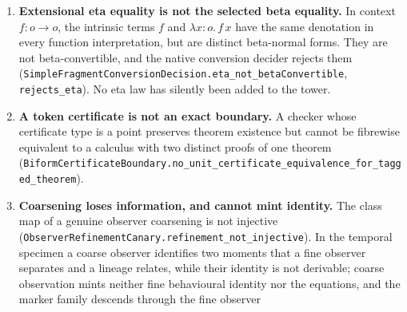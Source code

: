 \documentclass[11pt]{article}
\theoremstyle{definition}
\theoremstyle{remark}
\begin{document}
\begin{enumerate}
  ground type has no closed term, by its interpretation in the empty set.
  It has no beta class either. Thus unrestricted inhabitation reflection is
  false, and there is not even a function from this contextual tower ground
  fibre to the corresponding simple raw or quotient fibre
  (\nolinkurl{no_contextual_ground_class_retraction}). The empty telescope
  and final ground type are both formed, so adding endpoint formation alone
  does not repair the missing internal premises. The existing
  \nolinkurl{BoundaryJudgments.TowerMeaning} predicates for both checking
  and synthesis also hold for this example
  (\nolinkurl{omega_tower_check_meaning},
  \nolinkurl{omega_tower_synthesis_meaning}); this is a semantic assertion,
  not acceptance by an executable checker. This is a boundary of the
  implemented permissive relation, not of Martin-L\"of type theory, the
  regular two-sort kernel, or Lean's kernel. It is compatible with conversion
  conservativity between two already translated simple terms. The separate
  four-rule declaration-aware structural checker does not include the
  lambda, application, or conversion rules used by this counterexample;
  no acceptance claim about that checker follows here.
\item \textbf{Extensional eta equality is not the selected beta equality.}
  In context $f:o\to o$, the intrinsic terms $f$ and $\lambda x:o.\,f\,x$
  have the same denotation in every function interpretation, but are distinct
  beta-normal forms. They are not beta-convertible, and the native conversion
  decider rejects them
  (\nolinkurl{SimpleFragmentConversionDecision.eta_not_betaConvertible},
  \nolinkurl{rejects_eta}). No eta law has silently been added to the tower.
\item \textbf{A token certificate is not an exact boundary.}  A checker whose
  certificate type is a point preserves theorem existence but cannot be
  fibrewise equivalent to a calculus with two distinct proofs of one theorem
  (\nolinkurl{BiformCertificateBoundary.no_unit_certificate_equivalence_for_tagged_theorem}).
\item \textbf{Coarsening loses information, and cannot mint identity.}  The
  class map of a genuine observer coarsening is not injective
  (\nolinkurl{ObserverRefinementCanary.refinement_not_injective}).  In the
  temporal specimen a coarse observer identifies two moments that a fine
  observer separates and a lineage relates, while their identity is not
  derivable; coarse observation mints neither fine behavioural identity nor
  the equations, and the marker family descends through the fine observer

\end{enumerate}
\end{document}
